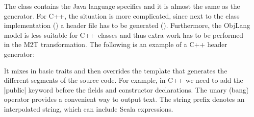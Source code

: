 The class \href{https://github.com/fikovnik/ttc14-fixml-sigma/blob/master/ttc14-fixml-base/src/fr/inria/spirals/sigma/ttc14/fixml/ObjLang2Java.scala}{} contains the Java language specifics and it is almost the same as the \Csharp \href{https://github.com/fikovnik/ttc14-fixml-sigma/blob/master/ttc14-fixml-base/src/fr/inria/spirals/sigma/ttc14/fixml/ObjLang2CSharp.scala}{} generator.
For C++, the situation is more complicated, since next to the class implementation (\href{https://github.com/fikovnik/ttc14-fixml-sigma/blob/master/ttc14-fixml-base/src/fr/inria/spirals/sigma/ttc14/fixml/ObjLang2CPPClassImpl.scala}{}) a header file has to be generated (\href{https://github.com/fikovnik/ttc14-fixml-sigma/blob/master/ttc14-fixml-base/src/fr/inria/spirals/sigma/ttc14/fixml/ObjLang2CPPClassHeader.scala}{}).
Furthermore, the ObjLang model is less suitable for C++ classes and thus extra work has to be performed in the M2T transformation.
%
The following is an example of a C++ header generator:
%
%
It mixes in basic traits and then overrides the template that generates the different segments of the source code.
For example, in C++ we need to add the \Scala|public| keyword before the fields and constructor declarations.
The unary \Scala{!} (bang) operator provides a convenient way to output text.
The  string prefix denotes an interpolated string, which can include Scala expressions.
